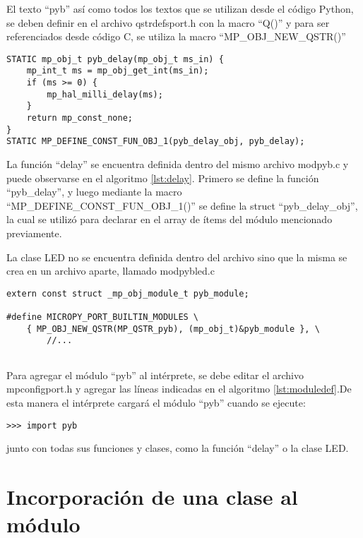 El texto “pyb” así como todos los textos que se utilizan desde el código Python, se deben definir en el archivo qstrdefsport.h con la macro “Q()” y para ser referenciados desde código C, se utiliza la macro “MP\_OBJ\_NEW\_QSTR()”

\begin{lstlisting}[label={lst:delay},caption=Definición de la función de C que se ejecuta al invocar la función delay desde Python.] 
STATIC mp_obj_t pyb_delay(mp_obj_t ms_in) {
    mp_int_t ms = mp_obj_get_int(ms_in);
    if (ms >= 0) {
        mp_hal_milli_delay(ms);
    }
    return mp_const_none;
}
STATIC MP_DEFINE_CONST_FUN_OBJ_1(pyb_delay_obj, pyb_delay);

\end{lstlisting}

La función “delay” se encuentra definida dentro del mismo archivo modpyb.c y puede observarse en el algoritmo \ref{lst:delay}.
Primero se define la función “pyb\_delay”, y luego mediante la macro “MP\_DEFINE\_CONST\_FUN\_OBJ\_1()” se define la struct “pyb\_delay\_obj”, la cual se utilizó para declarar en el array de ítems del módulo mencionado previamente.

La clase LED no se encuentra definida dentro del archivo sino que la misma se crea en un archivo aparte, llamado modpybled.c

\begin{lstlisting}[label={lst:moduledef},caption=Inclusión de el módulo pyb a la lista de módulos disponibles.] 
extern const struct _mp_obj_module_t pyb_module;

#define MICROPY_PORT_BUILTIN_MODULES \
    { MP_OBJ_NEW_QSTR(MP_QSTR_pyb), (mp_obj_t)&pyb_module }, \
		//...
		
\end{lstlisting}

Para agregar el módulo “pyb” al intérprete, se debe editar el archivo mpconfigport.h y agregar las líneas indicadas en el algoritmo \ref{lst:moduledef}.De esta manera el intérprete cargará el módulo “pyb” cuando se ejecute:
\begin{verbatim}
>>> import pyb
\end{verbatim}
junto con todas sus funciones y clases, como la función “delay” o la clase LED.


\section{Incorporación de una clase al módulo}

